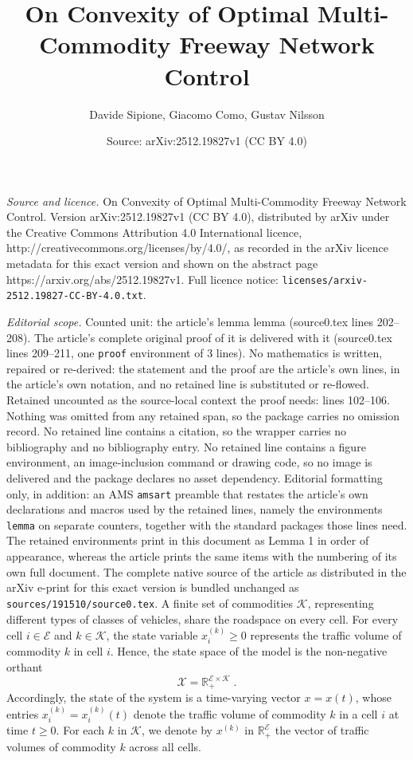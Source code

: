 \documentclass[10pt,a4paper]{amsart}
\title{On Convexity of Optimal Multi-Commodity Freeway Network Control}
\author{Davide Sipione, Giacomo Como, Gustav Nilsson}
\date{Source: arXiv:2512.19827v1 (CC BY 4.0)}
\newcommand{\R}{\mathbb{R}}
\newcommand{\be}{\begin{equation}}
\newcommand{\ee}{\end{equation}}
\newcommand{\mc}{\mathcal}
\begin{document}
\maketitle

\noindent\emph{Source and licence.} On Convexity of Optimal Multi-Commodity Freeway Network Control. Version arXiv:2512.19827v1 (CC BY 4.0), distributed by arXiv under the Creative Commons Attribution 4.0 International licence, http://creativecommons.org/licenses/by/4.0/, as recorded in the arXiv licence metadata for this exact version and shown on the abstract page https://arxiv.org/abs/2512.19827v1. Full licence notice: \texttt{licenses/arxiv-2512.19827-CC-BY-4.0.txt}.\par\smallskip

\noindent\textit{Editorial scope.} Counted unit: the article's lemma lemma (source0.tex lines 202--208). The article's complete original proof of it is delivered with it (source0.tex lines 209--211, one \texttt{proof} environment of 3 lines). No mathematics is written, repaired or re-derived: the statement and the proof are the article's own lines, in the article's own notation, and no retained line is substituted or re-flowed.  Retained uncounted as the source-local context the proof needs: lines 102--106.  Nothing was omitted from any retained span, so the package carries no omission record.  No retained line contains a citation, so the wrapper carries no bibliography and no bibliography entry.  No retained line contains a figure environment, an image-inclusion command or drawing code, so no image is delivered and the package declares no asset dependency.  Editorial formatting only, in addition: an AMS \texttt{amsart} preamble that restates the article's own declarations and macros used by the retained lines, namely the environments \texttt{lemma} on separate counters, together with the standard packages those lines need.  The retained environments print in this document as Lemma 1 in order of appearance, whereas the article prints the same items with the numbering of its own full document.  The complete native source of the article as distributed in the arXiv e-print for this exact version is bundled unchanged as \texttt{sources/191510/source0.tex}.
A finite set of commodities $\mc{K}$, representing different types of classes of vehicles, share the roadspace on every cell. For every cell $i \in \mc{E}$ and $k \in \mc{K}$, the state variable $x_i^{(k)} \geq 0$ represents the traffic volume of commodity $k$ in cell $i$. Hence, the state space of the model is the non-negative orthant
\be\label{eq:statespace}
\mc{X} = \R^{\mc{E}\times\mc{K}}_+ \;.
\ee
Accordingly, the state of the system is a time-varying vector $x = x(t)$, whose entries $x_i^{(k)} = x_i^{(k)}(t)$ denote the traffic volume of commodity $k$ in a cell $i$ at time $t \geq 0$. For each $k$ in $\mc{K}$, we denote by $x^{(k)}$ in $\R_+^{\mc E}$ the vector of traffic volumes of commodity $k$ across all cells.
\end{document}
